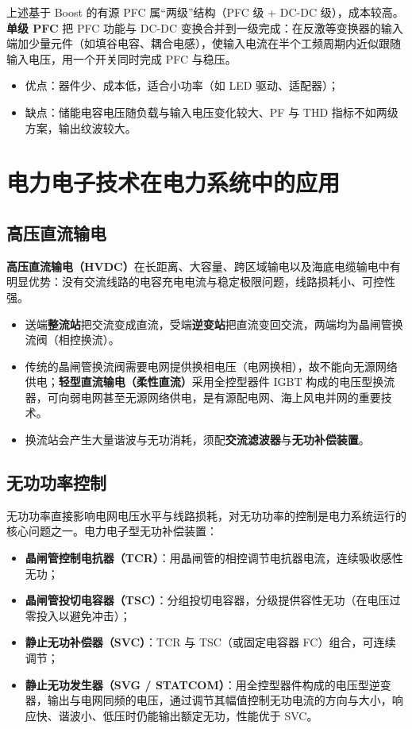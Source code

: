 上述基于 Boost 的有源 PFC 属“两级”结构（PFC 级 + DC-DC 级），成本较高。\textbf{单级 PFC} 把 PFC 功能与 DC-DC 变换合并到一级完成：在反激等变换器的输入端加少量元件（如填谷电容、耦合电感），使输入电流在半个工频周期内近似跟随输入电压，用一个开关同时完成 PFC 与稳压。

\begin{itemize}
  \item 优点：器件少、成本低，适合小功率（如 LED 驱动、适配器）；
  \item 缺点：储能电容电压随负载与输入电压变化较大、PF 与 THD 指标不如两级方案，输出纹波较大。
\end{itemize}

\section{电力电子技术在电力系统中的应用}

\subsection{高压直流输电}

\textbf{高压直流输电（HVDC）}在长距离、大容量、跨区域输电以及海底电缆输电中有明显优势：没有交流线路的电容充电电流与稳定极限问题，线路损耗小、可控性强。

\begin{itemize}
  \item 送端\textbf{整流站}把交流变成直流，受端\textbf{逆变站}把直流变回交流，两端均为晶闸管换流阀（相控换流）。
  \item 传统的晶闸管换流阀需要电网提供换相电压（电网换相），故不能向无源网络供电；\textbf{轻型直流输电（柔性直流）}采用全控型器件 IGBT 构成的电压型换流器，可向弱电网甚至无源网络供电，是有源配电网、海上风电并网的重要技术。
  \item 换流站会产生大量谐波与无功消耗，须配\textbf{交流滤波器}与\textbf{无功补偿装置}。
\end{itemize}

\subsection{无功功率控制}

无功功率直接影响电网电压水平与线路损耗，对无功功率的控制是电力系统运行的核心问题之一。电力电子型无功补偿装置：

\begin{itemize}
  \item \textbf{晶闸管控制电抗器（TCR）}：用晶闸管的相控调节电抗器电流，连续吸收感性无功；
  \item \textbf{晶闸管投切电容器（TSC）}：分组投切电容器，分级提供容性无功（在电压过零投入以避免冲击）；
  \item \textbf{静止无功补偿器（SVC）}：TCR 与 TSC（或固定电容器 FC）组合，可连续调节；
  \item \textbf{静止无功发生器（SVG / STATCOM）}：用全控型器件构成的电压型逆变器，输出与电网同频的电压，通过调节其幅值控制无功电流的方向与大小，响应快、谐波小、低压时仍能输出额定无功，性能优于 SVC。
\end{itemize}

